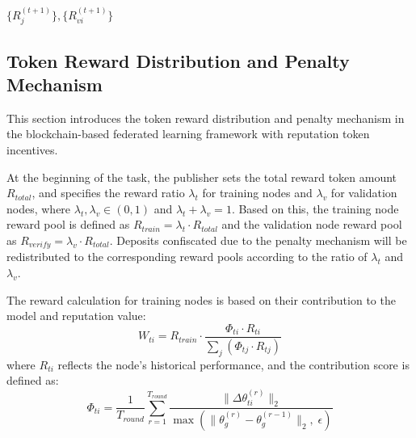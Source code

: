 \documentclass[a4paper]{cas-dc}
\begin{document}
\begin{algorithm}
	\caption{Reputation Update Mechanism}
	\label{sf4}
	\Return $\{R_j^{(t+1)}\}, \{R_{vi}^{(t+1)}\}$\;
\end{algorithm}

\subsection{Token Reward Distribution and Penalty Mechanism}
This section introduces the token reward distribution and penalty mechanism in the blockchain-based federated learning framework with reputation token incentives.

At the beginning of the task, the publisher sets the total reward token amount $R_{total}$, and specifies the reward ratio $\lambda_t$ for training nodes and $\lambda_v$ for validation nodes, where $\lambda_t, \lambda_v \in (0,1)$ and $\lambda_t + \lambda_v = 1$. Based on this, the training node reward pool is defined as $R_{train} = \lambda_t \cdot R_{total}$ and the validation node reward pool as $R_{verify} = \lambda_v \cdot R_{total}$. Deposits confiscated due to the penalty mechanism will be redistributed to the corresponding reward pools according to the ratio of $\lambda_t$ and $\lambda_v$.

The reward calculation for training nodes is based on their contribution to the model and reputation value:
\begin{equation}
	W_{ti} = R_{train} \cdot \frac{\Phi_{ti} \cdot R_{ti}}{\sum_j (\Phi_{tj} \cdot R_{tj})}
\end{equation}
where $R_{ti}$ reflects the node's historical performance, and the contribution score is defined as:
\begin{equation}
	\Phi_{ti} = \frac{1}{T_{round}} \sum_{r=1}^{T_{round}} \frac{\|\Delta\theta_{ti}^{(r)}\|_2}{\max(\|\theta_g^{(r)} - \theta_g^{(r-1)}\|_2,\;\epsilon)}
\end{equation}
\end{document}
